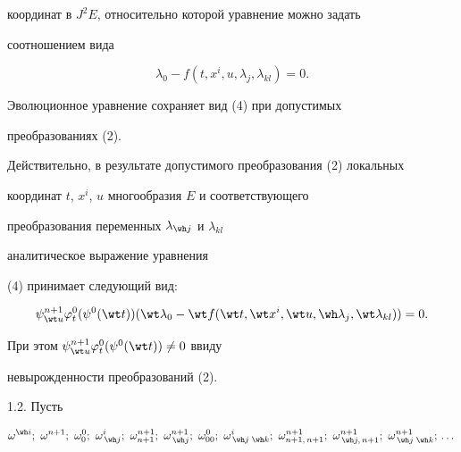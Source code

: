 координат в $J^2E$, относительно которой уравнение можно задать 


соотношением вида 


\begin{equation} 


\lambda_0-f(t,x^i,u,\lambda_j,\lambda_{kl})=0. 


\end{equation} 


 


\begin{note} Эволюционное уравнение сохраняет вид (4) при допустимых 


преобразованиях (2). 


\end{note} 


 


Действительно, в результате допустимого преобразования (2) локальных 


координат $t$, $x^i$, $u$ многообразия $E$ и соответствующего 


преобразования переменных $\lambda_{\wh j}$ и $\lambda_{kl}$ 


аналитическое выражение уравнения 


(4) принимает следующий вид: 


$$ 


\psi^{n+1}_{\wt u}\varphi^0_t(\psi^0(\wt t)) 


(\wt \lambda_0-\wt f(\wt t,\wt x^i,\wt u,\wh \lambda_j,\wt\lambda_{kl}))=0. 


$$ 


При этом $\psi^{n+1}_{\wt u}\varphi^0_t(\psi^0(\wt t))\ne 0$ ввиду 


невырожденности преобразований (2). 


\medskip 


 


1.2. Пусть 


\begin{equation} 


\omega^{\wh i};\ \omega^{n+1};\ \omega^0_0;\ \omega^i_{\,\wh j}; 


\ \omega^{n+1}_{n+1};\ \omega^{n+1}_{\,\wh j}; 


\ \omega^0_{00};\ \omega^i_{\,\wh j\;\wh k}; 


\ \omega^{n+1}_{n+1,\,n+1};\ \omega^{n+1}_{\,\wh j,\,n+1}; 


\ \omega^{n+1}_{\,\wh j\;\wh k};\,\dotsc 


\end{equation} 


